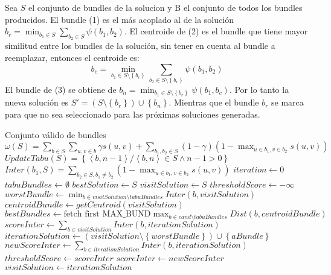 Sea $S$ el conjunto de bundles de la solucion y B el conjunto de todos los bundles producidos. El bundle (1) es el más acoplado al de la solución $b_r = \min_{b_1 \in S}{\sum_{b_2 \in S}{\psi(b_1,b_2)}}$. El centroide de (2) es el bundle que tiene mayor similitud entre los bundles de la solución, sin tener en cuenta al bundle a reemplazar, entonces el centroide es:
$$b_c = \min_{b_1 \in S \setminus \left\{b_r\right\}}{\sum_{b_2 \in S \setminus \left\{b_r\right\}}{\psi(b_1,b_2)}}$$
El bundle de (3) se obtiene de $b_n = \min_{b_1 \in S \setminus \left\{b_r\right\}}{\psi(b_1,b_c)}$. Por lo tanto la nueva solución es $S' = (S \setminus \left\{b_r\right\}) \cup \left\{b_n\right\}$. Mientras que el bundle $b_r$ se marca para que no sea seleccionado para las próximas soluciones generadas.
\begin{algorithm}[H]
\begin{algorithmic}[1]
\ENSURE Conjunto válido de bundles
\STATE $\omega(S) = \sum_{b \in S}{\sum_{u,v \in b}{\gamma s(u,v)}} + \sum_{b_1,b_2 \in S}{(1-\gamma) (1-\max_{u \in b_1, v \in b_2}{s(u,v)})}$
\STATE $UpdateTabu(S) = \left\{ \left\langle b, n-1 \right\rangle  / \left\langle b, n \right\rangle \in S \wedge n-1 > 0 \right\}$
\STATE $Inter(b_1, S) = \sum_{b_2 \in S, b_1\neq b_2}{(1-\max_{u \in b_1, v \in b_2}{s(u,v)})}$
\STATE $iteration \leftarrow 0$
\STATE $tabuBundles \leftarrow \emptyset$
\STATE $bestSolution \leftarrow S$
\STATE $visitSolution \leftarrow S$
\STATE $thresholdScore \leftarrow -\infty$ 
  \STATE $worstBundle \leftarrow \min_{b \in visitSolution \setminus tabuBundles}{Inter(b, visitSolution)}$
	\STATE $centroidBundle \leftarrow getCentroid(visitSolution)$
	\STATE $bestBundles \leftarrow \text{fetch first MAX\_BUND} \max_{b \in cand \setminus tabuBundles}{Dist(b, centroidBundle)}$
	\STATE $scoreInter \leftarrow \sum_{b \in visitSolution}{Inter(b, iterationSolution)}$
    \STATE $iterationSolution \leftarrow (visitSolution \setminus \left\{worstBundle\right\}) \cup \left\{aBundle\right\}$
    \STATE $newScoreInter \leftarrow \sum_{b \in iterationSolution}{Inter(b, iterationSolution)}$
			\STATE $thresholdScore \leftarrow scoreInter$
      \STATE $scoreInter \leftarrow newScoreInter$
      \STATE $visitSolution \leftarrow iterationSolution$

\end{algorithmic}
\end{algorithm}
